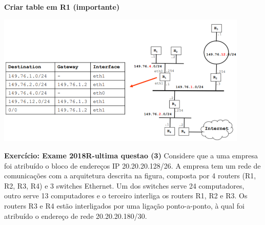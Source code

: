 \documentclass[../resumosRCOM.tex]{subfiles}
\begin{document}
\textbf{Criar table em R1 (importante)}
\begin{center}
    \includegraphics[width=12cm]{images/RCOM21.png}
\end{center}

\textbf{Exercício: Exame 2018R-ultima questao (3)}
Considere que a uma empresa foi atribuído o bloco de endereços IP 20.20.20.128/26. A empresa tem um rede de comunicações com a arquitetura descrita na figura, composta por 4 routers (R1, R2, R3, R4) e 3 switches Ethernet. 
Um dos switches serve 24 computadores, outro serve 13 computadores e o terceiro interliga os routers R1, R2 e R3. Os routers R3 e R4 estão interligados por uma ligação ponto-a-ponto, à qual foi atribuído o endereço de rede 20.20.20.180/30.
\end{document}
